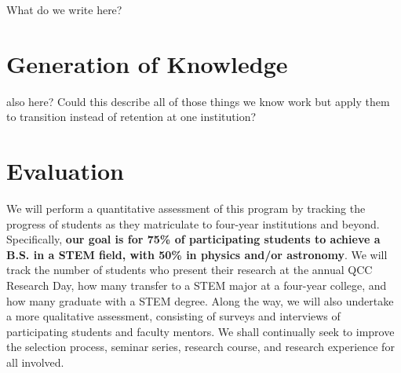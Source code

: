 \documentclass[12pt]{article}
\begin{document}
What do we write here? 

\section{Generation of Knowledge}

also here? Could this describe all of those things we know work but apply them to transition instead of retention at one institution?

\section{Evaluation}



We will perform a quantitative assessment of this program by tracking the progress of students as they matriculate to four-year institutions and beyond. Specifically, {\bf our goal is for 75\% of participating students to achieve a B.S. in a STEM field, with 50\% in physics and/or astronomy}. We will track the number of students who present their research at the annual QCC Research Day, how many transfer to a STEM major at a four-year college, and how many graduate with a STEM degree.  Along the way, we will also undertake a more qualitative assessment, consisting of surveys and interviews of participating students and faculty mentors.  We shall continually seek to improve the selection process, seminar series, research course, and research experience for all involved.
\end{document}
